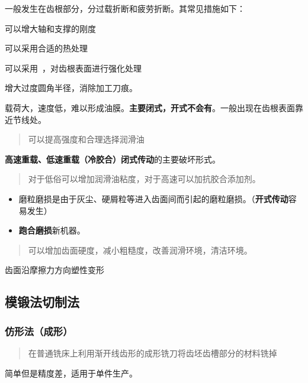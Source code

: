 \documentclass[twocolumn]{ctexart}
\begin{document}
\begin{description}[leftmargin=1.7cm,style=nextline,nosep]%
  \item[轮齿折断]  一般发生在齿根部分，分过载折断和疲劳折断。其常见措施如下：
  \begin{description}[leftmargin=0.4cm,style=nextline,nosep]%
    \item[1] 可以增大轴和支撑的刚度
    \item[2] 可以采用合适的热处理
    \item[3] 可以采用~，对齿根表面进行强化处理
    \item[4] 增大过度圆角半径，消除加工刀痕。   
  \end{description}
  \item[齿面点蚀]   载荷大，速度低，难以形成油膜。\textbf{主要闭式，开式不会有}。一般出现在齿根表面靠近节线处。
  \begin{quote}
  {\qquad{}\ccwd\kaishu{}
  可以提高强度和合理选择润滑油
  }
  \end{quote}
  \item[齿面胶合]   \textbf{高速重载、低速重载（冷胶合）闭式传动}的主要破坏形式。
  \begin{quote}
  {\qquad{}\ccwd\kaishu{}
  对于低俗可以增加润滑油粘度，对于高速可以加抗胶合添加剂。
  }
  \end{quote}
  \item[齿面磨损]    \begin{itemize}[nosep]
  \item \textnormal{磨粒磨损}是由于灰尘、硬屑粒等进入齿面间而引起的磨粒磨损。（\textbf{开式传动}容易发生）
  \item \textbf{跑合磨损}新机器。
  \end{itemize}
  \begin{quote}
  {\qquad{}\ccwd\kaishu{}
  可以增加齿面硬度，减小粗糙度，改善润滑环境，清洁环境。
  }
  \end{quote}
  \item[齿面塑性变形] 齿面沿摩擦力方向塑性变形
\end{description}
\subsection{模锻法切制法}
\subsubsection{仿形法（成形）}
\begin{quote}
{\qquad{}\ccwd\kaishu{}
在普通铣床上利用渐开线齿形的成形铣刀将齿坯齿槽部分的材料铣掉
}
\end{quote}
简单但是精度差，适用于单件生产。
\end{document}
